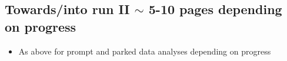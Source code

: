 \documentclass[12pt]{article}
\begin{document}
\subsection{Towards/into run II $\sim$ 5-10 pages depending on progress}
\label{sec:run2}
\begin{itemize}
\item As above for prompt and parked data analyses depending on progress
\end{itemize}
\end{document}
